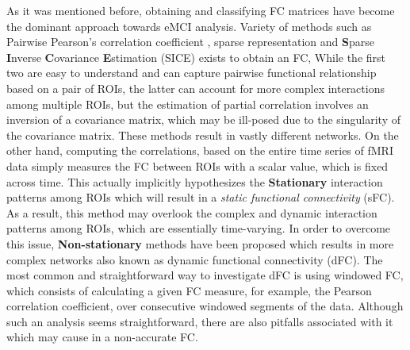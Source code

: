 \documentclass[preprint,12pt]{elsarticle}
\begin{document}
%	
As it was mentioned before, obtaining and classifying FC matrices have become the dominant approach towards eMCI analysis. 
Variety of methods such as Pairwise Pearson’s correlation coefficient \cite{r10, r11}, sparse representation \cite{r10, r12, r13}  and \textbf{S}parse \textbf{I}nverse \textbf{C}ovariance \textbf{E}stimation (SICE)\cite{r15} exists to obtain an FC,
While the first two are easy to understand and can capture pairwise functional relationship based on a pair of ROIs, the latter can account for more complex interactions among multiple ROIs, but the estimation of partial correlation involves an inversion of a covariance matrix, which may be ill-posed due to the singularity of the covariance matrix. 
These methods result in vastly different networks\cite{r35}. On the other hand, computing the correlations, based on the entire time series of fMRI data simply measures the FC between ROIs with a scalar value, which is fixed across time. This actually implicitly hypothesizes the \textbf{Stationary} interaction patterns among ROIs which will result in a \textit{static functional connectivity} (sFC). As a result, this method may overlook the complex and dynamic interaction patterns among ROIs, which are essentially time-varying. In order to overcome this issue, \textbf{Non-stationary} methods have been proposed which results in more complex networks also known as dynamic functional connectivity (dFC)\cite{r16,r19,r56}. The most common and straightforward way to investigate dFC is using windowed FC, which consists of calculating a given FC measure, for example, the Pearson correlation coefficient, over consecutive windowed segments of the data\cite{r58,r59}. Although such an analysis seems straightforward, there are also pitfalls associated with it which may cause in a non-accurate FC\cite{r57}.

\end{document}
